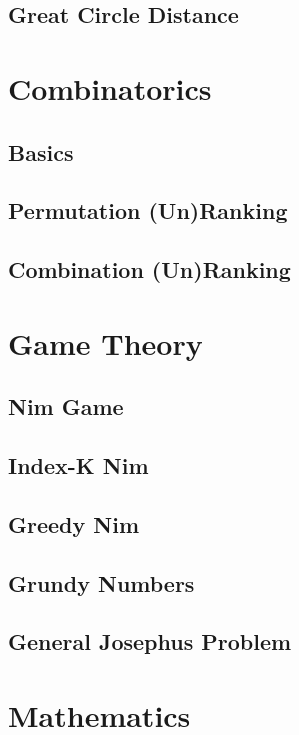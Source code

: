 		\subsection{Great Circle Distance}
			
	\section{Combinatorics}
		\subsection{Basics}
			
		\subsection{Permutation (Un)Ranking}
			
		\subsection{Combination (Un)Ranking}
			
	\section{Game Theory}
		\subsection{Nim Game}
			
		\subsection{Index-K Nim}
			
		\subsection{Greedy Nim}
			
		\subsection{Grundy Numbers}
			
		\subsection{General Josephus Problem}
			
	\section{Mathematics}
